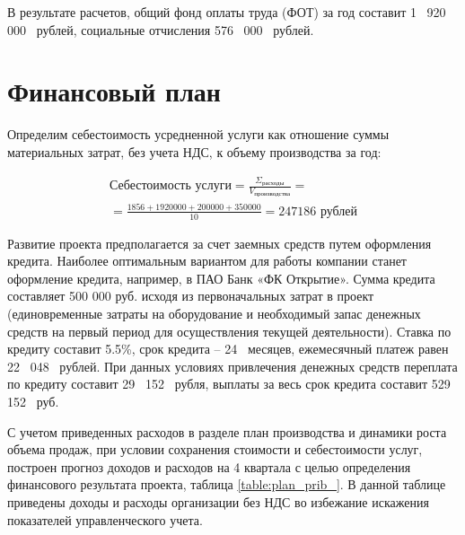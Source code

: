 В результате расчетов, общий фонд оплаты труда (ФОТ) за год составит 1~ 920~ 000~ рублей, социальные отчисления 576~ 000~ рублей. 

\section{Финансовый план}

Определим себестоимость усредненной услуги как отношение суммы материальных затрат, без учета НДС, к объему производства за год:

\begin{multline*}
	\text{Себестоимость услуги} = \frac{\Sigma_{\text{расходы}}}{V_{\text{производства}}}= \\
	= \frac{1 856+1 920 000 + 200 000 + 350 000}{10} = 247 186 \text{ рублей}
\end{multline*}

Развитие проекта предполагается за счет заемных средств путем оформления кредита.
Наиболее оптимальным вариантом для работы компании станет оформление кредита, например, в ПАО Банк «ФК Открытие». Сумма кредита составляет 500 000 руб. исходя из первоначальных затрат в проект (единовременные затраты на оборудование и необходимый запас денежных средств на первый период для осуществления текущей деятельности).
Ставка по кредиту составит 5.5\%, срок кредита – 24~ месяцев, ежемесячный платеж равен 22~ 048~ рублей. При данных условиях привлечения денежных средств переплата по кредиту составит 29~ 152~ рубля, выплаты за весь срок кредита составит 529~ 152~ руб.

С учетом приведенных расходов в разделе план производства и динамики роста объема продаж, при условии сохранения стоимости и себестоимости услуг, построен прогноз доходов и расходов на 4 квартала с целью определения финансового результата проекта, таблица \ref{table:plan_prib_}.
В данной таблице приведены доходы и расходы организации без НДС во избежание искажения показателей управленческого учета.



